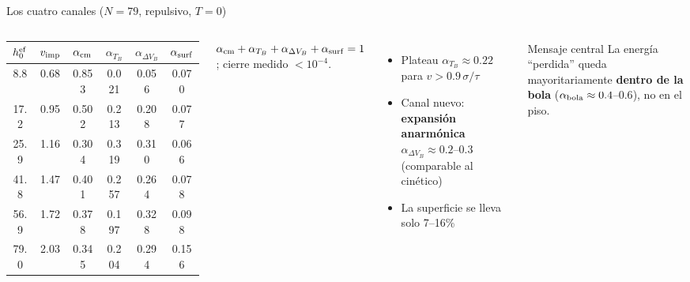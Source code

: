 \documentclass[11pt,aspectratio=169]{beamer}
\begin{document}
\begin{frame}{Los cuatro canales ($N=79$, repulsivo, $T=0$)}
\begin{columns}[T]
\small
\begin{tabular}{cccccc}
\toprule
$h_0^{\rm ef}$ & $v_{\rm imp}$ & $\alpha_{\rm cm}$ & $\alpha_{T_B}$ &
$\alpha_{\Delta V_B}$ & $\alpha_{\rm surf}$ \\
\midrule
 8.8 & 0.68 & 0.853 & 0.021 & 0.056 & 0.070 \\
17.2 & 0.95 & 0.502 & 0.213 & 0.208 & 0.077 \\
25.9 & 1.16 & 0.304 & 0.319 & 0.310 & 0.066 \\
41.8 & 1.47 & 0.401 & 0.257 & 0.264 & 0.078 \\
56.9 & 1.72 & 0.378 & 0.197 & 0.328 & 0.098 \\
79.0 & 2.03 & 0.345 & 0.204 & 0.294 & 0.156 \\
\bottomrule
\end{tabular}

\medskip
\footnotesize $\alpha_{\rm cm}+\alpha_{T_B}+\alpha_{\Delta V_B}
+\alpha_{\rm surf}=1$; cierre medido $<10^{-4}$.
\begin{itemize}
    \item Plateau $\alpha_{T_B}\approx0.22$ para $v>0.9\,\sigma/\tau$
    \item Canal nuevo: \textbf{expansión anarmónica}
    $\alpha_{\Delta V_B}\approx0.2$--$0.3$ (comparable al cinético)
    \item La superficie se lleva solo 7--16\%
\end{itemize}
\begin{alertblock}{\small Mensaje central}
\small La energía ``perdida'' queda mayoritariamente
\textbf{dentro de la bola} ($\alpha_{\rm bola}\approx0.4$--$0.6$),
no en el piso.
\end{alertblock}
\end{columns}
\end{frame}
\end{document}
